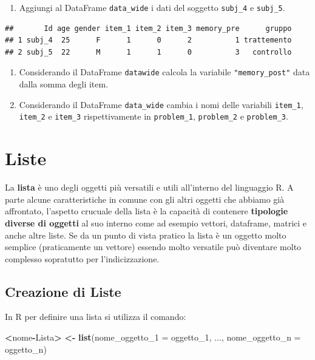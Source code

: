 \documentclass[
]{book}
\newenvironment{Shaded}{\begin{snugshade}}{\end{snugshade}}
\newcommand{\DataTypeTok}[1]{\textcolor[rgb]{0.13,0.29,0.53}{#1}}
\newcommand{\DecValTok}[1]{\textcolor[rgb]{0.00,0.00,0.81}{#1}}
\newcommand{\ErrorTok}[1]{\textcolor[rgb]{0.64,0.00,0.00}{\textbf{#1}}}
\newcommand{\KeywordTok}[1]{\textcolor[rgb]{0.13,0.29,0.53}{\textbf{#1}}}
\newcommand{\NormalTok}[1]{#1}
\newcommand{\OperatorTok}[1]{\textcolor[rgb]{0.81,0.36,0.00}{\textbf{#1}}}
\newcommand{\StringTok}[1]{\textcolor[rgb]{0.31,0.60,0.02}{#1}}
\providecommand{\tightlist}{%
  \setlength{\itemsep}{0pt}\setlength{\parskip}{0pt}}
\begin{document}
\begin{enumerate}
\def\labelenumi{\arabic{enumi}.}
\setcounter{enumi}{2}
\tightlist
\item
  Aggiungi al DataFrame \texttt{data\_wide} i dati del soggetto \texttt{subj\_4} e \texttt{subj\_5}.
\end{enumerate}

\begin{verbatim}
##       Id age gender item_1 item_2 item_3 memory_pre      gruppo
## 1 subj_4  25      F      1      0      2          1 trattemento
## 2 subj_5  22      M      1      1      0          3   controllo
\end{verbatim}

\begin{enumerate}
\def\labelenumi{\arabic{enumi}.}
\setcounter{enumi}{3}
\tightlist
\item
  Considerando il DataFrame \texttt{datawide} calcola la variabile \texttt{"memory\_post"} data dalla somma degli item.
\item
  Considerando il DataFrame \texttt{data\_wide} cambia i nomi delle variabili \texttt{item\_1}, \texttt{item\_2} e \texttt{item\_3} rispettivamente in \texttt{problem\_1}, \texttt{problem\_2} e \texttt{problem\_3}.
\end{enumerate}

\hypertarget{list}{%
\chapter{Liste}\label{list}}

La \textbf{lista} è uno degli oggetti più versatili e utili all'interno del linguaggio R. A parte alcune caratteristiche in comune con gli altri oggetti che abbiamo già affrontato, l'aspetto crucuale della lista è la capacità di contenere \textbf{tipologie diverse di oggetti} al suo interno come ad esempio vettori, dataframe, matrici e anche altre liste. Se da un punto di vista pratico la lista è un oggetto molto semplice (praticamente un vettore) essendo molto versatile può diventare molto complesso sopratutto per l'indicizzazione.

\hypertarget{creazione-di-liste}{%
\section{Creazione di Liste}\label{creazione-di-liste}}

In R per definire una lista si utilizza il comando:

\begin{Shaded}
\begin{Highlighting}[]
\OperatorTok{<}\NormalTok{nome}\OperatorTok{-}\NormalTok{Lista}\OperatorTok{>}\StringTok{ }\ErrorTok{<}\OperatorTok{-}\StringTok{ }\KeywordTok{list}\NormalTok{(}\DataTypeTok{nome_oggetto_1 =}\NormalTok{ oggetto_}\DecValTok{1}\NormalTok{, ..., }\DataTypeTok{nome_oggetto_n =}\NormalTok{ oggetto_n)}
\end{Highlighting}
\end{Shaded}
\end{document}
